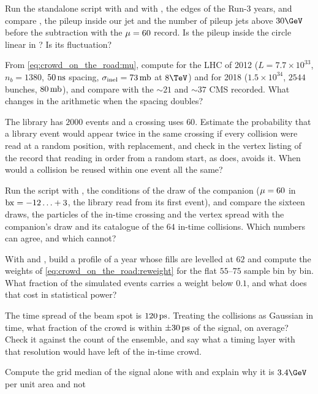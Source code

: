 \begin{exercises}
\item Run the standalone script with  and with
  , the edges of the Run-3 years, and compare \rhoPU, the
  pileup inside our jet and the number of pileup jets above $30\GeV$
  before the subtraction with the $\mu=60$ record. Is the pileup inside
  the circle linear in \mup? Is its fluctuation?
\item From \cref{eq:crowd_on_the_road:mu}, compute \mup for the LHC of
  2012 ($L=7.7\times10^{33}$, $n_b=1380$, $50\,\mathrm{ns}$ spacing,
  $\sigma_{\mathrm{inel}}=73\,\mathrm{mb}$ at $8\TeV$) and for 2018
  ($1.5\times10^{34}$, $2544$ bunches, $80\,\mathrm{mb}$), and compare with the
  $\sim21$ and $\sim37$ CMS recorded. What changes in the arithmetic when
  the spacing doubles?
\item The library has $2000$ events and a crossing uses $60$. Estimate
  the probability that a library event would appear twice in the same
  crossing if every collision were read at a random position, with
  replacement, and check in the vertex listing of the record that reading
  in order from a random start, as \CMSSW does, avoids it. When would a
  collision be reused within one event all the same?
\item Run the script with , the conditions of the
  \CMSSW draw of the companion ($\mu=60$ in $\mathrm{bx}=-12\ldots+3$, the
  library read from its first event), and compare the sixteen draws, the
  particles of the in-time crossing and the vertex spread with the
  companion's draw and its catalogue of the $64$ in-time collisions. Which
  numbers can agree, and which cannot?
\item With  and , build a profile
  of a year whose fills are levelled at $62$ and compute the weights of
  \cref{eq:crowd_on_the_road:reweight} for the flat $55$--$75$ sample bin
  by bin. What fraction of the simulated events carries a weight below
  $0.1$, and what does that cost in statistical power?
\item The time spread of the beam spot is $120\,\mathrm{ps}$. Treating the
  collisions as Gaussian in time, what fraction of the crowd is within
  $\pm30\,\mathrm{ps}$ of the signal, on average? Check it against the
   count of the ensemble, and say what a timing layer
  with that resolution would have left of the in-time crowd.
\item Compute the grid median of the signal alone with
   and explain why it is $3.4\GeV$ per unit area and not

\end{exercises}
